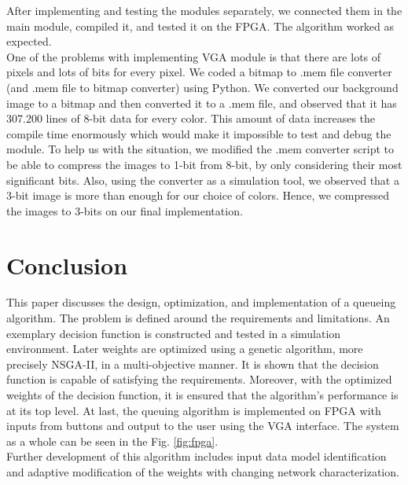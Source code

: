 \documentclass[journal,twoside]{IEEEtran}
\begin{document}
\indent After implementing and testing the modules separately, we connected them in the main module, compiled it, and tested it on the FPGA. The algorithm worked as expected.\\

\indent One of the problems with implementing VGA module is that there are lots of pixels and lots of bits for every pixel. We coded a bitmap to .mem file converter (and .mem file to bitmap converter) using Python. We converted our background image to a bitmap and then converted it to a .mem file, and observed that it has 307.200 lines of 8-bit data for every color. This amount of data increases the compile time enormously which would make it impossible to test and debug the module. To help us with the situation, we modified the .mem converter script to be able to compress the images to 1-bit from 8-bit, by only considering their most significant bits. Also, using the converter as a simulation tool, we observed that a 3-bit image is more than enough for our choice of colors. Hence, we compressed the images to 3-bits on our final implementation.\\




\section{Conclusion}
This paper discusses the design, optimization, and implementation of a queueing algorithm. The problem is defined around the requirements and limitations. An exemplary decision function is constructed and tested in a simulation environment. Later weights are optimized using a genetic algorithm, more precisely NSGA-II, in a multi-objective manner. It is shown that the decision function is capable of satisfying the requirements. Moreover, with the optimized weights of the decision function, it is ensured that the algorithm's performance is at its top level. At last, the queuing algorithm is implemented on FPGA with inputs from buttons and output to the user using the VGA interface. The system as a whole can be seen in the Fig. \ref{fig:fpga}. \\ 

\indent Further development of this algorithm includes input data model identification and adaptive modification of the weights with changing network characterization.




\end{document}
